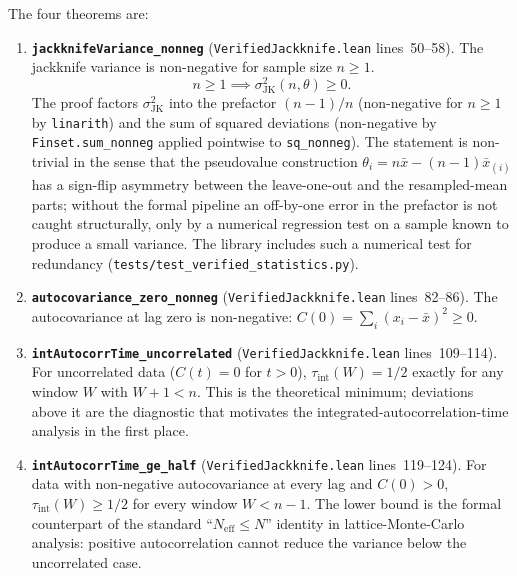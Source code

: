 \documentclass[11pt]{article}
\begin{document}
The four theorems are:

\begin{enumerate}
\item \textbf{\texttt{jackknifeVariance\_nonneg}}
(\texttt{VerifiedJackknife.lean} lines~50--58). The jackknife
variance is non-negative for sample size $n \geq 1$.
\[
n \geq 1 \implies \sigma^2_{\mathrm{JK}}(n, \theta) \geq 0.
\]
The proof factors $\sigma^2_{\mathrm{JK}}$ into the prefactor
$(n-1)/n$ (non-negative for $n \geq 1$ by \texttt{linarith}) and
the sum of squared deviations (non-negative by
\texttt{Finset.sum\_nonneg} applied pointwise to
\texttt{sq\_nonneg}). The statement is non-trivial in the sense
that the pseudovalue construction
$\theta_i = n \bar{x} - (n-1) \bar{x}_{(i)}$ has a sign-flip
asymmetry between the leave-one-out and the resampled-mean parts;
without the formal pipeline an off-by-one error in the prefactor
is not caught structurally, only by a numerical regression test
on a sample known to produce a small variance. The library
includes such a numerical test for redundancy
(\texttt{tests/test\_verified\_statistics.py}).

\item \textbf{\texttt{autocovariance\_zero\_nonneg}}
(\texttt{VerifiedJackknife.lean} lines~82--86). The autocovariance
at lag zero is non-negative:
$C(0) = \sum_i (x_i - \bar{x})^2 \geq 0$.

\item \textbf{\texttt{intAutocorrTime\_uncorrelated}}
(\texttt{VerifiedJackknife.lean} lines~109--114). For uncorrelated
data ($C(t) = 0$ for $t > 0$),
$\tau_{\mathrm{int}}(W) = 1/2$ exactly for any window $W$ with
$W + 1 < n$. This is
the theoretical minimum; deviations above it are the diagnostic
that motivates the integrated-autocorrelation-time analysis in the
first place.

\item \textbf{\texttt{intAutocorrTime\_ge\_half}}
(\texttt{VerifiedJackknife.lean} lines~119--124). For data with
non-negative autocovariance at every lag and $C(0) > 0$,
$\tau_{\mathrm{int}}(W) \geq 1/2$ for every window $W < n - 1$.
The lower bound is the formal counterpart of the standard
``$N_{\mathrm{eff}} \leq N$'' identity in lattice-Monte-Carlo
analysis: positive autocorrelation cannot reduce the variance
below the uncorrelated case.
\end{enumerate}
\end{document}
